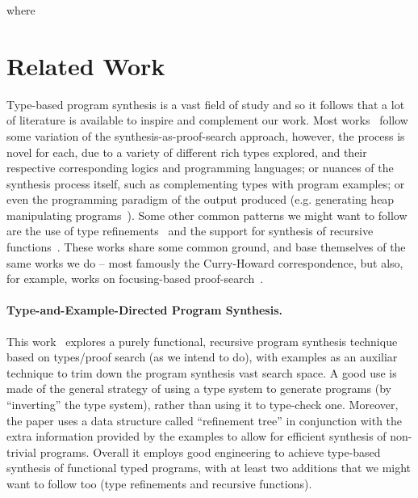 \documentclass{llncs}
\newcommand{\mypara}[1]{\paragraph{\textbf{#1}.}}
\begin{document}
where


\section{Related Work}

Type-based program synthesis is a vast field of study and so it
follows that a lot of literature is available to inspire and
complement our work. Most works~\cite{DBLP:conf/lopstr/HughesO20,DBLP:conf/pldi/PolikarpovaKS16,DBLP:conf/pldi/OseraZ15,DBLP:conf/popl/FrankleOWZ16} follow some variation of the
synthesis-as-proof-search approach, however, the process is novel for
each, due to a variety of different rich types explored, and their
respective corresponding logics and programming languages; or nuances
of the synthesis process itself, such as complementing types with
program examples; or even the programming paradigm of the output
produced (e.g. generating heap manipulating
programs~\cite{DBLP:journals/pacmpl/PolikarpovaS19}).  Some other
common patterns we might want to follow are the use of type
refinements~\cite{DBLP:conf/pldi/PolikarpovaKS16} and the support for synthesis of recursive
functions~\cite{DBLP:conf/pldi/PolikarpovaKS16,DBLP:conf/pldi/OseraZ15}.  These works share some common ground, and base
themselves of the same works we do -- most famously the Curry-Howard
correspondence, but also, for example, works on focusing-based
proof-search~\cite{10.1093/logcom/2.3.297}.

\mypara{Type-and-Example-Directed Program Synthesis} This
work~\cite{DBLP:conf/pldi/OseraZ15,DBLP:conf/popl/FrankleOWZ16}
explores a purely functional, recursive program synthesis technique
based on types/proof search (as we intend to do), with examples as an
auxiliar technique to trim down the program synthesis vast search
space. A good use is
made of the general strategy of using a type system to generate
programs (by ``inverting'' the type system), rather than using it to
type-check one.  Moreover, the paper uses a data structure called
``refinement tree'' in conjunction with the extra information provided
by the examples to allow for efficient synthesis of non-trivial
programs. Overall it employs good engineering to achieve type-based
synthesis of functional typed programs, with at least two additions
that we might want to follow too (type refinements and recursive
functions).
\end{document}
